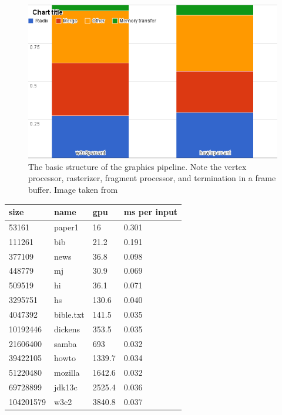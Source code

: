 \begin{figure}[ht!]
\centering
\includegraphics[width=1.0\textwidth]{images/saprofile.png}
\caption{The basic structure of the graphics pipeline. Note the vertex processor, rasterizer, fragment processor, and termination in a frame buffer. Image taken from  \protect\cite{pipeline-image-ref}}
\label{fig:graphics-pipeline3}
\end{figure}

\begin{table}[h]
\begin{tabular}{@{}llll@{}}
\toprule
size      & name      & gpu    & ms per input \\ \midrule
53161     & paper1    & 16     & 0.301        \\
111261    & bib       & 21.2   & 0.191        \\
377109    & news      & 36.8   & 0.098        \\
448779    & mj        & 30.9   & 0.069        \\
509519    & hi        & 36.1   & 0.071        \\
3295751   & hs        & 130.6  & 0.040        \\
4047392   & bible.txt & 141.5  & 0.035        \\
10192446  & dickens   & 353.5  & 0.035        \\
21606400  & samba     & 693    & 0.032        \\
39422105  & howto     & 1339.7 & 0.034        \\
51220480  & mozilla   & 1642.6 & 0.032        \\
69728899  & jdk13c    & 2525.4 & 0.036        \\
104201579 & w3c2      & 3840.8 & 0.037        \\ \bottomrule
\end{tabular}
\end{table}

